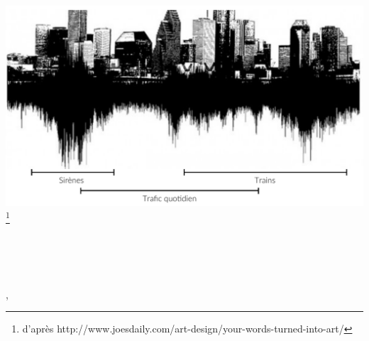 \begin{titlepage}
    \begin{addmargin}[-1cm]{-3cm}
    \begin{center}
        \large  

        \hfill

        \vfill

        \begingroup
            \color{Maroon}\spacedallcaps{\myTitle} \\ \bigskip
        \endgroup
		\medskip 
		\mySubtitle \\ \bigskip

		\vfill
		
        \includegraphics[scale=.3]{gfx/title/citySound}\footnote{d'après http://www.joesdaily.com/art-design/your-words-turned-into-art/} \\ \medskip
		
		\vfill
		
        \spacedlowsmallcaps{\myName}

        \vfill
        
        \myDegree \\ \bigskip
        
        \myDepartment \\                            
        \myFaculty \\
        \myUni , \myLocation\\ \bigskip
		
		\vfill 
		
        \myTime 

        \vfill                      

    \end{center}  
  \end{addmargin}       
\end{titlepage}   